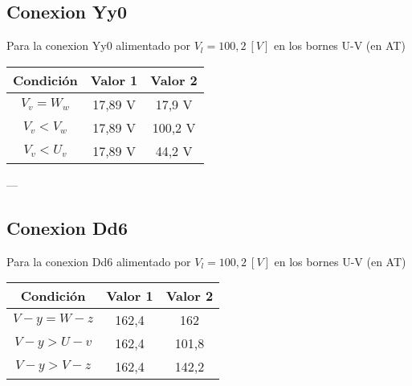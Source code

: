 \documentclass{article}
\begin{document}
\subsection{Conexion Yy0}
Para la conexion Yy0 alimentado por $V_l = 100,2\ [V]$
en los bornes U-V (en AT)
\begin{center}
\begin{tabular}{|c|c|c|}
\hline
\textbf{Condición} & \textbf{Valor 1} & \textbf{Valor 2} \\
\hline
$V_v = W_w$ & 17,89 V & 17,9 V \\
\hline
$V_v < V_w$ & 17,89 V & 100,2 V \\
\hline
$V_v < U_v$ & 17,89 V & 44,2 V \\
\hline
\end{tabular}
\end{center}
---

\subsection{Conexion Dd6}
Para la conexion Dd6 alimentado por $V_l = 100,2\ [V]$
en los bornes U-V (en AT)
\begin{center}
\begin{tabular}{|c|c|c|}
    \hline
    \textbf{Condición} & \textbf{Valor 1} & \textbf{Valor 2} \\
    \hline
    $V-y = W-z$ & 162,4 & 162 \\
    \hline
    $V-y > U-v$ & 162,4 & 101,8 \\
    \hline
    $V-y > V-z$ & 162,4 & 142,2 \\
    \hline
\end{tabular}
\end{center}
\end{document}
